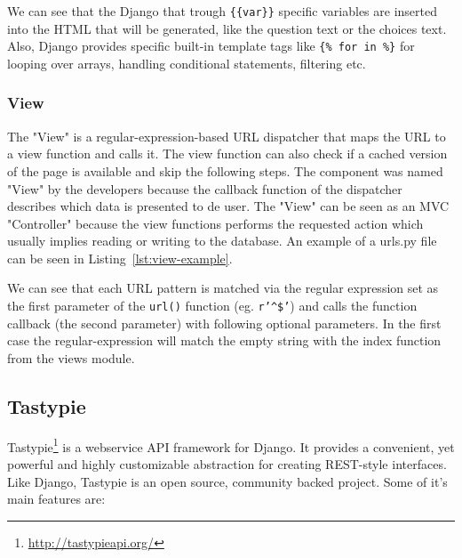

We can see that the Django that trough \texttt{\{\{var\}\}} specific variables are inserted into the HTML that will be generated, like the question text or the choices text. Also, Django provides specific built-in template tags like \texttt{\{\% for in \%\}} for looping over arrays, handling conditional statements, filtering etc.

\subsubsection{View}
\label{sub-sub-sec:view}

The "View" is a regular-expression-based URL dispatcher that maps the URL to a view function and calls it. The view function can also check if a cached version of the page is available and skip the following steps. The component was named "View" by the developers because the callback function of the dispatcher describes which data is presented to de user. The "View" can be seen as an MVC "Controller" because the view functions performs the requested action which usually implies reading or writing to the database. An example of a urls.py file can be seen in Listing~\ref{lst:view-example}.



We can see that each URL pattern is matched via the regular expression set as the first parameter of the \texttt{url()} function (eg. \texttt{r'\^{}\$'}) and calls the function callback (the second parameter) with following optional parameters. In the first case the regular-expression will match the empty string with the index function from the views module.



\subsection{Tastypie}
\label{sub-sec:tastypie}

Tastypie\footnote{\url{http://tastypieapi.org/}} is a webservice API framework for Django. It provides a convenient, yet powerful and highly customizable abstraction for creating REST-style interfaces. Like Django, Tastypie is an open source, community backed project. Some of it's main features are:

